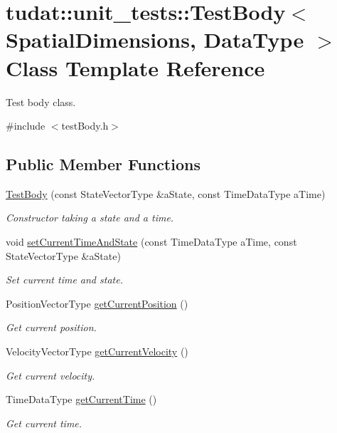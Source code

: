 \hypertarget{classtudat_1_1unit__tests_1_1TestBody}{}\section{tudat\+:\+:unit\+\_\+tests\+:\+:Test\+Body$<$ Spatial\+Dimensions, Data\+Type $>$ Class Template Reference}
\label{classtudat_1_1unit__tests_1_1TestBody}


Test body class.  




{\ttfamily \#include $<$test\+Body.\+h$>$}

\subsection*{Public Member Functions}
\begin{DoxyCompactItemize}
\item 
\hyperlink{classtudat_1_1unit__tests_1_1TestBody_a5cf893fba94794b380b249bfc46c972b}{Test\+Body} (const State\+Vector\+Type \&a\+State, const Time\+Data\+Type a\+Time)
\begin{DoxyCompactList}\small\item\em Constructor taking a state and a time. \end{DoxyCompactList}\item 
void \hyperlink{classtudat_1_1unit__tests_1_1TestBody_a910de69e011ddb330d9a9019dc8f6a58}{set\+Current\+Time\+And\+State} (const Time\+Data\+Type a\+Time, const State\+Vector\+Type \&a\+State)
\begin{DoxyCompactList}\small\item\em Set current time and state. \end{DoxyCompactList}\item 
Position\+Vector\+Type \hyperlink{classtudat_1_1unit__tests_1_1TestBody_aba1f689f4257ce9486fbb678aab36c8a}{get\+Current\+Position} ()
\begin{DoxyCompactList}\small\item\em Get current position. \end{DoxyCompactList}\item 
Velocity\+Vector\+Type \hyperlink{classtudat_1_1unit__tests_1_1TestBody_a68da07511b9cc5c88549d7cc451a2ca2}{get\+Current\+Velocity} ()
\begin{DoxyCompactList}\small\item\em Get current velocity. \end{DoxyCompactList}\item 
Time\+Data\+Type \hyperlink{classtudat_1_1unit__tests_1_1TestBody_aa21a70459d44cf3e6f5962a1f85b1819}{get\+Current\+Time} ()
\begin{DoxyCompactList}\small\item\em Get current time. \end{DoxyCompactList}\end{DoxyCompactItemize}


